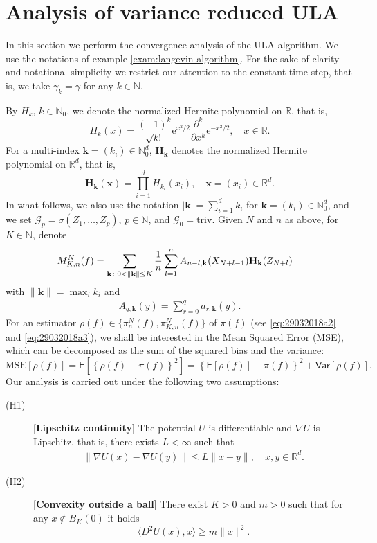 \documentclass[bj]{imsart}
\def\PE{\mathsf{E}}
\def\PVar{\mathsf{Var}}
\newcommand{\ps}[2]{\langle #1, #2 \rangle}
\def\nset{\mathbb{N}}
\def\rset{\mathbb{R}}
\def\rme{\mathrm{e}}
\def\rset{\mathbb{R}}
\begin{document}
\section{Analysis of variance reduced ULA}
\label{sec:ula_analysis}
In this section we perform the convergence analysis of the ULA algorithm. We use the notations of example \ref{exam:langevin-algorithm}. For the sake of clarity and notational simplicity we restrict our attention to the constant time step, that is, we take $\gamma_k =\gamma$ for any $k \in \nset$.

By $H_k$, $k\in\mathbb N_0$,
we denote the normalized Hermite polynomial on $\mathbb R$, that is,
$$
H_k(x)=\frac{(-1)^k}{\sqrt{k!}}\rme^{x^2/2}\frac{\partial^k}{\partial x^k}\rme^{-x^2/2},
\quad x\in\mathbb R.
$$
For a multi-index $\mathbf{k}=(k_i)\in\mathbb N_0^d$,
$\mathbf{H}_\mathbf{k}$ denotes the normalized Hermite polynomial on $\mathbb R^d$, that is,
$$
\mathbf{H}_\mathbf{k}(\mathbf{x})=\prod_{i=1}^d H_{k_i}(x_i),\quad \mathbf{x}=(x_i)\in\mathbb R^d.
$$
In what follows, we also use the notation
$|\mathbf{k}|=\sum_{i=1}^d k_i$ for $\mathbf{k}=(k_i)\in\mathbb N_0^d$,
and we set $\mathcal G_p=\sigma(Z_1,\ldots,Z_p)$, $p\in\mathbb N$, and $\mathcal G_0=\mathrm{triv}$.
Given $N$ and $n$ as above, for $K\in\mathbb N$, denote
\begin{align}
M_{K,n}^N(f) & =\sum_{\mathbf k\colon 0<\|\mathbf{k}\|\le K}\frac{1}{n}\sum_{l=1}^{n}A_{n-l,\mathbf{k}}(X_{N+l-1})\mathbf{H}_\mathbf{k}(Z_{N+l})
\label{eq:29032018a5}
\notag
\end{align}
with \(\|\mathbf{k}\|=\max_{i} k_i\) and 
\begin{eqnarray*}
A_{q,\mathbf{k}}(y)=\sum_{r=0}^{ q } \bar{a}_{r,\mathbf{k}}(y).
\end{eqnarray*}
For an estimator $\rho(f)\in\{\pi_n^N(f),\pi_{K,n}^N(f)\}$
of $\pi(f)$ (see \eqref{eq:29032018a2} and \eqref{eq:29032018a3}), we shall be interested in the Mean Squared Error (MSE),
which can be decomposed as the sum of the squared  bias
and the  variance:
\begin{equation}
\label{eq:29032018a4}
\mathrm{MSE}\left[\rho(f)\right] = \PE\left[\left\{\rho(f)-\pi(f)\right\}^2\right]
=\left\{\PE[\rho(f)]-\pi(f)\right\}^2 +\PVar[\rho(f)].
\end{equation}
Our analysis is carried out under the following two assumptions:
\begin{description}
\item[(H1)][\textbf{Lipschitz continuity}] The potential $U$ is differentiable and $\nabla U$ is Lipschitz, that is, there exists $L < \infty$ such that
\begin{eqnarray*}
\| \nabla U(x)-\nabla U(y) \| \leq L \|x-y\|, \quad x,y\in \rset^d.
\end{eqnarray*}
\item[(H2)][\textbf{Convexity outside a ball}] There exist $K>0$ and $m>0$ such that for any $x\not\in B_{K}(0)$  it holds
\begin{equation*}
\ps{D^2U(x)}{x} \geq m\|x\|^2.
\end{equation*}
\end{description}
\end{document}
